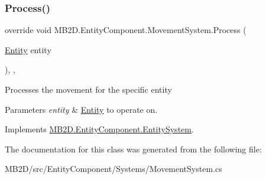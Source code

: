 \subsubsection{\texorpdfstring{Process()}{Process()}}
{\footnotesize\ttfamily override void M\+B2\+D.\+Entity\+Component.\+Movement\+System.\+Process (\begin{DoxyParamCaption}\item[{\hyperlink{class_m_b2_d_1_1_entity_component_1_1_entity}{Entity}}]{entity }\end{DoxyParamCaption})\hspace{0.3cm}{\ttfamily [inline]}, {\ttfamily [protected]}, {\ttfamily [virtual]}}



Processes the movement for the specific entity 


\begin{DoxyParams}{Parameters}
{\em entity} & \hyperlink{class_m_b2_d_1_1_entity_component_1_1_entity}{Entity} to operate on.\\
\hline
\end{DoxyParams}


Implements \hyperlink{class_m_b2_d_1_1_entity_component_1_1_entity_system_abbf83b87cb5d12754fb058cef50451fa}{M\+B2\+D.\+Entity\+Component.\+Entity\+System}.



The documentation for this class was generated from the following file\+:\begin{DoxyCompactItemize}
\item 
M\+B2\+D/src/\+Entity\+Component/\+Systems/Movement\+System.\+cs\end{DoxyCompactItemize}
